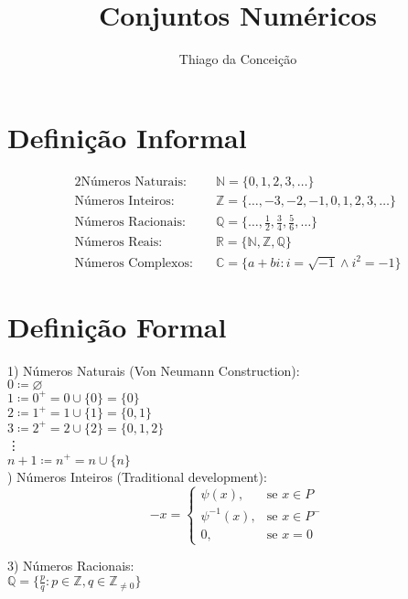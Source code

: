 \documentclass[a4paper]{article}
\title{Conjuntos Numéricos}
\author{Thiago da Conceição}
\date{}
\newcommand{\N}{\mathbb{N}}
\newcommand{\Z}{\mathbb{Z}}
\newcommand{\Q}{\mathbb{Q}}
\newcommand{\R}{\mathbb{R}}
\newcommand{\C}{\mathbb{C}}
\begin{document}
\maketitle

\section{Definição Informal}
\begin{alignat*}{2}
\text{Números Naturais:} \quad & \N = \{0, 1, 2, 3, \dots\} \\
\text{Números Inteiros:} \quad & \Z = \{\dots, -3, -2, -1, 0, 1, 2, 3, \dots\} \\
\text{Números Racionais:} \quad & \Q = \{\dots, \frac{1}{2}, \frac{3}{4}, \frac{5}{6}, \dots\} \\
\text{Números Reais:} \quad & \R = \{\N, \Z, \Q\} \\
\text{Números Complexos:} \quad & \C = \{a + bi : i = \sqrt{-1} \land i^2 = -1\}
\end{alignat*}

\section{Definição Formal}
1) Números Naturais (Von Neumann Construction):\\
\newline
$0 \coloneqq \varnothing$ \\
$1 \coloneqq 0^+ = 0 \cup \{0\} = \{0\}$ \\
$2 \coloneqq 1^+ = 1 \cup \{1\} = \{0,1\}$ \\
$3 \coloneqq 2^+ = 2 \cup \{2\} = \{0,1,2\}$ \\
\vdots \\
$n + 1 \coloneqq n^+ = n \cup \{n\}$\\
) Números Inteiros (Traditional development):\\

\[ -x = \begin{cases}
\psi(x), & \text{se } x \in P \\
\psi^{-1}(x), & \text{se } x \in P^{-} \\
0, & \text{se } x = 0
\end{cases} \]

3) Números Racionais:\\

$\Q = \{\frac{p}{q} : p \in \Z, q \in \Z_{\neq 0} \}$\\
\end{document}
